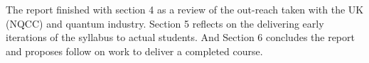 The report finished with section 4 as a review of the out-reach taken with the UK (NQCC) and quantum industry.
Section 5 reflects on the delivering early iterations of the syllabus to actual students.
And Section 6 concludes the report and proposes follow on work to deliver a completed course.
